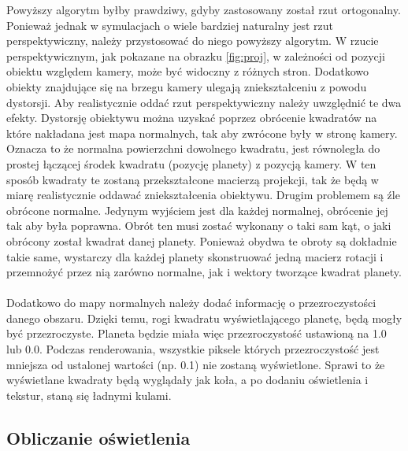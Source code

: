 Powyższy algorytm byłby prawdziwy, gdyby zastosowany został rzut ortogonalny. Ponieważ jednak w symulacjach o wiele bardziej naturalny jest rzut perspektywiczny, należy przystosować do niego powyższy algorytm. W rzucie perspektywicznym, jak pokazane na obrazku \hyperref[fig:proj]{\ref{fig:proj}}, w zależności od pozycji obiektu względem kamery, może być widoczny z różnych stron. Dodatkowo obiekty znajdujące się na brzegu kamery ulegają zniekształceniu z powodu dystorsji. Aby realistycznie oddać rzut perspektywiczny należy uwzględnić te dwa efekty. Dystorsję obiektywu można uzyskać poprzez obrócenie kwadratów na które nakładana jest mapa normalnych, tak aby zwrócone były w stronę kamery. Oznacza to że normalna powierzchni dowolnego kwadratu, jest równoległa do prostej łączącej środek kwadratu (pozycję planety) z pozycją kamery. W ten sposób kwadraty te zostaną przekształcone macierzą projekcji, tak że będą w miarę realistycznie oddawać zniekształcenia obiektywu. Drugim problemem są źle obrócone normalne. Jedynym wyjściem jest dla każdej normalnej, obrócenie jej tak aby była poprawna. Obrót ten musi zostać wykonany o taki sam kąt, o jaki obrócony został kwadrat danej planety. Ponieważ obydwa te obroty są dokładnie takie same, wystarczy dla każdej planety skonstruować jedną macierz rotacji i przemnożyć przez nią zarówno normalne, jak i wektory tworzące kwadrat planety.


\paragraph{}

Dodatkowo do mapy normalnych należy dodać informację o przezroczystości danego obszaru. Dzięki temu, rogi kwadratu wyświetlającego planetę, będą mogły być przezroczyste. Planeta będzie miała więc przezroczystość ustawioną na 1.0 lub 0.0. Podczas renderowania, wszystkie piksele których przezroczystość jest mniejsza od ustalonej wartości (np. 0.1) nie zostaną wyświetlone. Sprawi to że wyświetlane kwadraty będą wyglądały jak koła, a po dodaniu oświetlenia i tekstur, staną się ładnymi kulami.

\subsection{Obliczanie oświetlenia}\label{sub:obliczanie oświetlenia}
\paragraph{}

